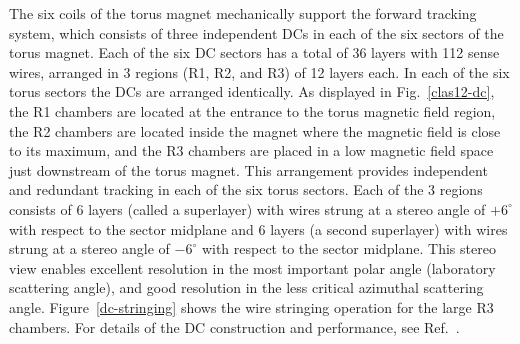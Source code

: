 \documentclass[final,3p]{elsarticle}
\begin{document}
\begin{twocolumn}
The six coils of the torus magnet mechanically support the forward tracking system, which consists of three
independent DCs in each of the six sectors of the torus magnet. Each of the six DC sectors has a total of 36
layers with 112 sense wires, arranged in 3 regions (R1, R2, and R3) of 12 layers each. In each of the six torus
sectors the DCs are arranged identically. As displayed in Fig.~\ref{clas12-dc}, the R1 chambers are located at
the entrance to the torus magnetic field region, the R2 chambers are located inside the magnet where the
magnetic field is close to its maximum, and the R3 chambers are placed in a low magnetic field space just
downstream of the torus magnet. This arrangement provides independent and redundant tracking in each of the
six torus sectors. Each of the 3 regions consists of 6 layers (called a superlayer) with wires strung at a stereo
angle of $+6^\circ$ with respect to the sector midplane and 6 layers (a second superlayer) with wires strung at
a stereo angle of $-6^\circ$ with respect to the sector midplane. This stereo view enables excellent resolution in
the most important polar angle (laboratory scattering angle), and good resolution in the less critical azimuthal
scattering angle. Figure~\ref{dc-stringing} shows the wire stringing operation for the large R3 chambers. For
details of the DC construction and performance, see Ref.~\cite{DC}.


\end{twocolumn}
\end{document}
